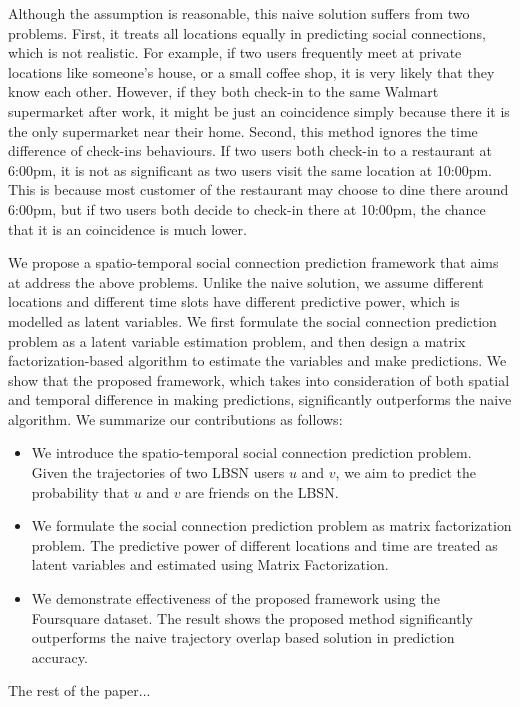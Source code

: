 Although the assumption is reasonable, this naive solution suffers from two problems. First, it treats all locations equally in predicting social connections, which is not realistic. For example, if two users frequently meet at private locations like someone's house, or a small coffee shop, it is very likely that they know each other. However, if they both check-in to the same Walmart supermarket after work, it might be just an coincidence simply because there it is the only supermarket near their home. Second, this method ignores the time difference of check-ins behaviours. If two users both check-in to a restaurant at 6:00pm, it is not as significant as two users visit the same location at 10:00pm. This is because most customer of the restaurant may choose to dine there around 6:00pm, but if two users both decide to check-in there at 10:00pm, the chance that it is an coincidence is much lower.

We propose a spatio-temporal social connection prediction framework that aims at address the above problems. Unlike the naive solution, we assume different locations and different time slots have different predictive power, which is modelled as latent variables. We first formulate the social connection prediction problem as a latent variable estimation problem, and then design a matrix factorization-based algorithm to estimate the variables and make predictions. We show that the proposed framework, which takes into consideration of both spatial and temporal difference in making predictions, significantly outperforms the naive algorithm. We summarize our contributions as follows:
\begin{itemize}

\item We introduce the spatio-temporal social connection prediction problem. Given the trajectories of two LBSN users $u$ and $v$, we aim to predict the probability that $u$ and $v$ are friends on the LBSN.

\item We formulate the social connection prediction problem as matrix factorization problem. The predictive power of different locations and time are treated as latent variables and estimated using Matrix Factorization.

\item We demonstrate effectiveness of the proposed framework using the Foursquare dataset. The result shows the proposed method significantly outperforms the naive trajectory overlap based solution in prediction accuracy.

\end{itemize} 

The rest of the paper...

  